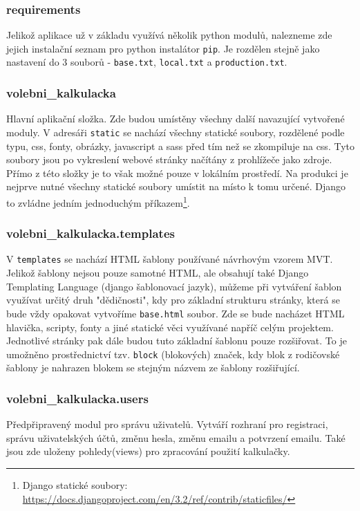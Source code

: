 \subsubsection{requirements}
Jelikož aplikace už v základu využívá několik python modulů, nalezneme zde jejich instalační seznam pro python instalátor \texttt{pip}. Je rozdělen stejně jako nastavení do 3 souborů - \texttt{base.txt}, \texttt{local.txt} a \texttt{production.txt}.

\subsubsection{volebni\_kalkulacka}
Hlavní aplikační složka. Zde budou umístěny všechny další navazující vytvořené moduly. V adresáři \texttt{static} se nachází všechny statické soubory, rozdělené podle typu, css, fonty, obrázky, javascript a sass před tím než se zkompiluje na css. Tyto soubory jsou po vykreslení webové stránky načítány z prohlížeče jako zdroje. Přímo z této složky je to však možné pouze v lokálním prostředí. Na produkci je nejprve nutné všechny statické soubory umístit na místo k tomu určené. Django to zvládne jedním jednoduchým příkazem\footnote{Django statické soubory: \url{https://docs.djangoproject.com/en/3.2/ref/contrib/staticfiles/}}.

\subsubsection{volebni\_kalkulacka.templates}
\par V \texttt{templates} se nachází HTML šablony používané návrhovým vzorem MVT. Jelikož šablony nejsou pouze samotné HTML, ale obsahují také Django Templating Language (django šablonovací jazyk), můžeme při vytváření šablon využívat určitý druh "dědičnosti", kdy pro základní strukturu stránky, která se bude vždy opakovat vytvoříme \texttt{base.html} soubor. Zde se bude nacházet HTML hlavička, scripty, fonty a jiné statické věci využívané napříč celým projektem. Jednotlivé stránky pak dále budou tuto základní šablonu pouze rozšiřovat. To je umožněno prostřednictví tzv. \texttt{block} (blokových) značek, kdy blok z rodičovské šablony je nahrazen blokem se stejným názvem ze šablony rozšiřující.

\subsubsection{volebni\_kalkulacka.users}
Předpřipravený modul pro správu uživatelů. Vytváří rozhraní pro registraci, správu uživatelských účtů, změnu hesla, změnu emailu a potvrzení emailu. Také jsou zde uloženy pohledy(views) pro zpracování použití kalkulačky.
 
